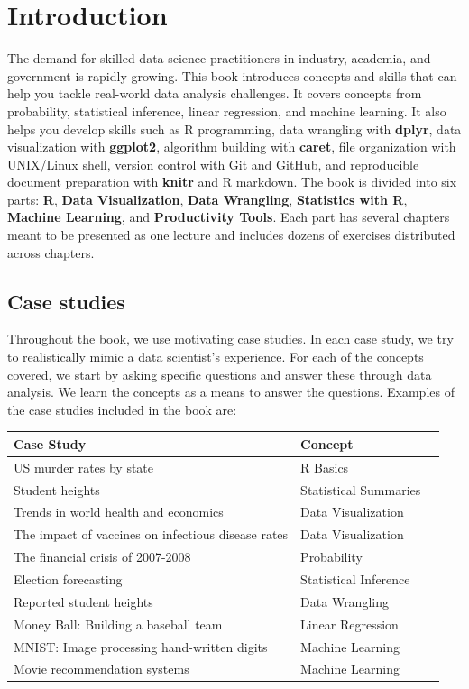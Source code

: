 \documentclass[
]{krantz}
\begin{document}
\hypertarget{introduction}{%
\chapter*{Introduction}\label{introduction}}


The demand for skilled data science practitioners in industry, academia, and government is rapidly growing. This book introduces concepts and skills that can help you tackle real-world data analysis challenges. It covers concepts from probability, statistical inference, linear regression, and machine learning. It also helps you develop skills such as R programming, data wrangling with \textbf{dplyr}, data visualization with \textbf{ggplot2}, algorithm building with \textbf{caret}, file organization with UNIX/Linux shell, version control with Git and GitHub, and reproducible document preparation with \textbf{knitr} and R markdown. The book is divided into six parts: \textbf{R}, \textbf{Data Visualization}, \textbf{Data Wrangling}, \textbf{Statistics with R}, \textbf{Machine Learning}, and \textbf{Productivity Tools}. Each part has several chapters meant to be presented as one lecture and includes dozens of exercises distributed across chapters.

\hypertarget{case-studies}{%
\section*{Case studies}\label{case-studies}}


Throughout the book, we use motivating case studies. In each case study, we try to realistically mimic a data scientist's experience. For each of the concepts covered, we start by asking specific questions and answer these through data analysis. We learn the concepts as a means to answer the questions. Examples of the case studies included in the book are:

\begin{longtable}[]{@{}lll@{}}
\toprule
Case Study & Concept &\tabularnewline
\midrule
\endhead
US murder rates by state & R Basics &\tabularnewline
Student heights & Statistical Summaries &\tabularnewline
Trends in world health and economics & Data Visualization &\tabularnewline
The impact of vaccines on infectious disease rates & Data Visualization &\tabularnewline
The financial crisis of 2007-2008 & Probability &\tabularnewline
Election forecasting & Statistical Inference &\tabularnewline
Reported student heights & Data Wrangling &\tabularnewline
Money Ball: Building a baseball team & Linear Regression &\tabularnewline
MNIST: Image processing hand-written digits & Machine Learning &\tabularnewline
Movie recommendation systems & Machine Learning &\tabularnewline
\bottomrule
\end{longtable}
\end{document}
